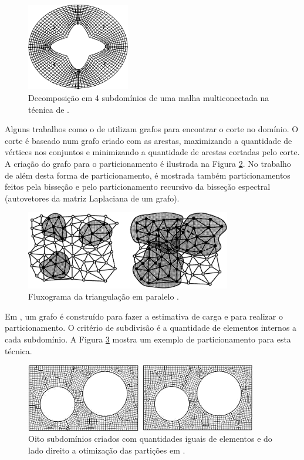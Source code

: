 \begin{figure}[htbp]
	\centering
	\includegraphics[width=0.4\textwidth]{fig/farhat.png}
	\caption{Decomposição em 4 subdomínios de uma malha multiconectada na técnica de \cite{bib:FARHAT88}.}
	\label{fig:farhat}
\end{figure}


Alguns trabalhos como o de \cite{bib:BARNARD94} utilizam grafos para encontrar o corte no domínio. O corte é baseado num grafo criado com as arestas, maximizando a quantidade de vértices nos conjuntos e minimizando a quantidade de arestas cortadas pelo corte. A criação do grafo para o particionamento é ilustrada na Figura \ref{fig:barnard}. No trabalho de \cite{bib:SIMON91} além desta forma de particionamento, é mostrada também particionamentos feitos pela bisseção e pelo particionamento recursivo da bisseção espectral (autovetores da matriz Laplaciana de um grafo).


\begin{figure}[htbp]
  \centering
  \includegraphics[width=0.8\textwidth]{fig/barnard.png}
   \caption{ Fluxograma da triangulação em paralelo \cite{bib:BARNARD94}.}
  \label{fig:barnard}
\end{figure}


Em \cite{bib:NIKISHKOV99}, um grafo é construído para fazer a estimativa de carga e para realizar o particionamento. O critério de subdivisão é a quantidade de elementos internos a cada subdomínio. A Figura \ref{fig:nikishkov} mostra um exemplo de particionamento para esta técnica.

\begin{figure}[htbp]
  \centering
  \includegraphics[width=0.9\textwidth]{fig/nikishkov.png}
   \caption{Oito subdomínios criados com quantidades iguais de elementos e do lado direito a otimização das partições em \cite{bib:NIKISHKOV99}. }
  \label{fig:nikishkov}
\end{figure}


